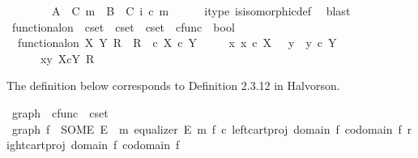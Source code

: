 \begin{isabellebody}
\ \ \isamarkupfalse%
\isanewline
\ \ \isamarkupfalse%
\ \isamarkupfalse%
\ {\isachardoublequoteopen}A\ {\isasymsetminus}\ {\isacharparenleft}{\kern0pt}C{\isacharcomma}{\kern0pt}\ m{\isacharparenright}{\kern0pt}\ {\isasymcong}\ B\ {\isasymsetminus}\ {\isacharparenleft}{\kern0pt}C{\isacharcomma}{\kern0pt}\ i\ {\isasymcirc}\isactrlsub c\ m{\isacharparenright}{\kern0pt}{\isachardoublequoteclose}\isanewline
\ \ \ \ \isamarkupfalse%
\ i{\isacharprime}{\kern0pt}{\isacharunderscore}{\kern0pt}type\ is{\isacharunderscore}{\kern0pt}isomorphic{\isacharunderscore}{\kern0pt}def\ \isamarkupfalse%
\ blast\isanewline
{}\isamarkupfalse%
%
\endisatagproof
{\isafoldproof}%
%
\isadelimproof
%
\endisadelimproof
%
\isadelimdocument
%
\endisadelimdocument
%
\isatagdocument
%
\isamarkuptrue%
%
\endisatagdocument
{\isafolddocument}%
%
\isadelimdocument
%
\endisadelimdocument
{}\isamarkupfalse%
\ functional{\isacharunderscore}{\kern0pt}on\ {\isacharcolon}{\kern0pt}{\isacharcolon}{\kern0pt}\ {\isachardoublequoteopen}cset\ {\isasymRightarrow}\ cset\ {\isasymRightarrow}\ cset\ {\isasymtimes}\ cfunc\ {\isasymRightarrow}\ bool{\isachardoublequoteclose}\ \isanewline
\ \ {\isachardoublequoteopen}functional{\isacharunderscore}{\kern0pt}on\ X\ Y\ R\ {\isacharequal}{\kern0pt}\ {\isacharparenleft}{\kern0pt}R\ \ {\isasymsubseteq}\isactrlsub c\ X\ {\isasymtimes}\isactrlsub c\ Y\ {\isasymand}\isanewline
\ \ \ \ {\isacharparenleft}{\kern0pt}{\isasymforall}x{\isachardot}{\kern0pt}\ x\ {\isasymin}\isactrlsub c\ X\ {\isasymlongrightarrow}\ {\isacharparenleft}{\kern0pt}{\isasymexists}{\isacharbang}{\kern0pt}\ y{\isachardot}{\kern0pt}\ \ y\ {\isasymin}\isactrlsub c\ Y\ {\isasymand}\ \ \isanewline
\ \ \ \ \ \ {\isasymlangle}x{\isacharcomma}{\kern0pt}y{\isasymrangle}\ {\isasymin}\isactrlbsub X{\isasymtimes}\isactrlsub cY\isactrlesub \ R{\isacharparenright}{\kern0pt}{\isacharparenright}{\kern0pt}{\isacharparenright}{\kern0pt}{\isachardoublequoteclose}%
\begin{isamarkuptext}%
The definition below corresponds to Definition 2.3.12 in Halvorson.%
\end{isamarkuptext}\isamarkuptrue%
\isamarkupfalse%
\ graph\ {\isacharcolon}{\kern0pt}{\isacharcolon}{\kern0pt}\ {\isachardoublequoteopen}cfunc\ {\isasymRightarrow}\ cset{\isachardoublequoteclose}\ \isanewline
\ {\isachardoublequoteopen}graph\ f\ {\isacharequal}{\kern0pt}\ {\isacharparenleft}{\kern0pt}SOME\ E{\isachardot}{\kern0pt}\ {\isasymexists}\ m{\isachardot}{\kern0pt}\ equalizer\ E\ m\ {\isacharparenleft}{\kern0pt}f\ {\isasymcirc}\isactrlsub c\ left{\isacharunderscore}{\kern0pt}cart{\isacharunderscore}{\kern0pt}proj\ {\isacharparenleft}{\kern0pt}domain\ f{\isacharparenright}{\kern0pt}\ {\isacharparenleft}{\kern0pt}codomain\ f{\isacharparenright}{\kern0pt}{\isacharparenright}{\kern0pt}\ {\isacharparenleft}{\kern0pt}right{\isacharunderscore}{\kern0pt}cart{\isacharunderscore}{\kern0pt}proj\ {\isacharparenleft}{\kern0pt}domain\ f{\isacharparenright}{\kern0pt}\ {\isacharparenleft}{\kern0pt}codomain\ f{\isacharparenright}{\kern0pt}{\isacharparenright}{\kern0pt}{\isacharparenright}{\kern0pt}{\isachardoublequoteclose}\isanewline

\end{isabellebody}
